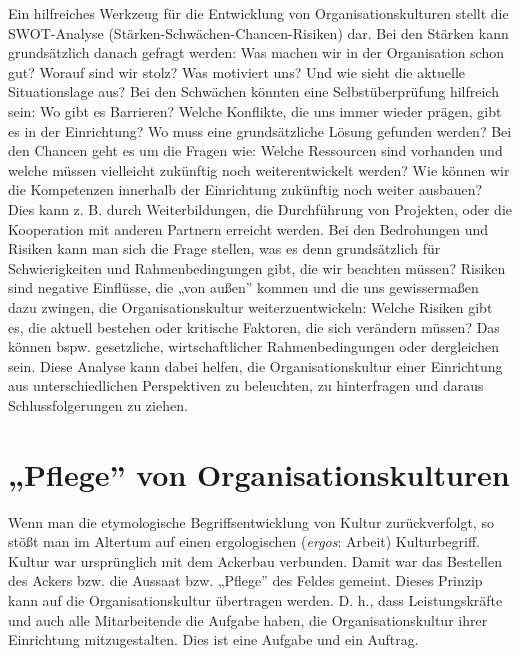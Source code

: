 \documentclass[
  letterpaper,
]{book}
\begin{document}
Ein hilfreiches Werkzeug für die Entwicklung von Organisationskulturen
stellt die SWOT-Analyse (Stärken-Schwächen-Chancen-Risiken) dar. Bei den
Stärken kann grundsätzlich danach gefragt werden: Was machen wir in der
Organisation schon gut? Worauf sind wir stolz? Was motiviert uns? Und
wie sieht die aktuelle Situationslage aus? Bei den Schwächen könnten
eine Selbstüberprüfung hilfreich sein: Wo gibt es Barrieren? Welche
Konflikte, die uns immer wieder prägen, gibt es in der Einrichtung? Wo
muss eine grundsätzliche Lösung gefunden werden? Bei den Chancen geht es
um die Fragen wie: Welche Ressourcen sind vorhanden und welche müssen
vielleicht zukünftig noch weiterentwickelt werden? Wie können wir die
Kompetenzen innerhalb der Einrichtung zukünftig noch weiter ausbauen?
Dies kann z. B. durch Weiterbildungen, die Durchführung von Projekten,
oder die Kooperation mit anderen Partnern erreicht werden. Bei den
Bedrohungen und Risiken kann man sich die Frage stellen, was es denn
grundsätzlich für Schwierigkeiten und Rahmenbedingungen gibt, die wir
beachten müssen? Risiken sind negative Einflüsse, die „von außen''
kommen und die uns gewissermaßen dazu zwingen, die Organisationskultur
weiterzuentwickeln: Welche Risiken gibt es, die aktuell bestehen oder
kritische Faktoren, die sich verändern müssen? Das können bspw.
gesetzliche, wirtschaftlicher Rahmenbedingungen oder dergleichen sein.
Diese Analyse kann dabei helfen, die Organisationskultur einer
Einrichtung aus unterschiedlichen Perspektiven zu beleuchten, zu
hinterfragen und daraus Schlussfolgerungen zu ziehen.

\section{„Pflege'' von
Organisationskulturen}\label{pflege-von-organisationskulturen}

Wenn man die etymologische Begriffsentwicklung von Kultur
zurückverfolgt, so stößt man im Altertum auf einen ergologischen
(\emph{ergos}: Arbeit) Kulturbegriff. Kultur war ursprünglich mit dem
Ackerbau verbunden. Damit war das Bestellen des Ackers bzw. die Aussaat
bzw. „Pflege'' des Feldes gemeint. Dieses Prinzip kann auf die
Organisationskultur übertragen werden. D. h., dass Leistungskräfte und
auch alle Mitarbeitende die Aufgabe haben, die Organisationskultur ihrer
Einrichtung mitzugestalten. Dies ist eine Aufgabe und ein Auftrag.
\end{document}
